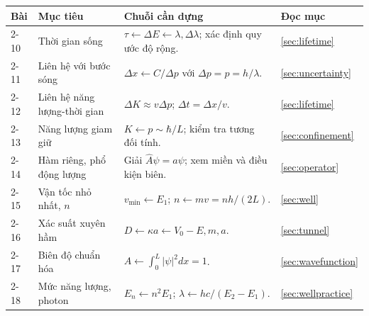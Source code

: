 \documentclass[11pt,a4paper]{article}
\begin{document}
\begin{tabularx}{\textwidth}{@{}Q{1.3cm}Q{3.2cm}YQ{1.6cm}@{}}
\toprule
\textbf{Bài} & \textbf{Mục tiêu} & \textbf{Chuỗi cần dựng} & \textbf{Đọc mục}\\-10 & Thời gian sống & $\tau\leftarrow\Delta E\leftarrow\lambda,\Delta\lambda$; xác định quy ước độ rộng. & \ref{sec:lifetime}\\
2-11 & Liên hệ với bước sóng & $\Delta x\leftarrow C/\Delta p$ với $\Delta p=p=h/\lambda$. & \ref{sec:uncertainty}\\
2-12 & Liên hệ năng lượng-thời gian & $\Delta K\approx v\Delta p$; $\Delta t=\Delta x/v$. & \ref{sec:lifetime}\\
2-13 & Năng lượng giam giữ & $K\leftarrow p\sim\hbar/L$; kiểm tra tương đối tính. & \ref{sec:confinement}\\
2-14 & Hàm riêng, phổ động lượng & Giải $\hat A\psi=a\psi$; xem miền và điều kiện biên. & \ref{sec:operator}\\
2-15 & Vận tốc nhỏ nhất, $n$ & $v_{\min}\leftarrow E_1$; $n\leftarrow mv=nh/(2L)$. & \ref{sec:well}\\
2-16 & Xác suất xuyên hầm & $D\leftarrow\kappa a\leftarrow V_0-E,m,a$. & \ref{sec:tunnel}\\
2-17 & Biên độ chuẩn hóa & $A\leftarrow\int_0^L|\psi|^2dx=1$. & \ref{sec:wavefunction}\\
2-18 & Mức năng lượng, photon & $E_n\leftarrow n^2E_1$; $\lambda\leftarrow hc/(E_2-E_1)$. & \ref{sec:wellpractice}\\
\bottomrule
\end{tabularx}
\end{document}
